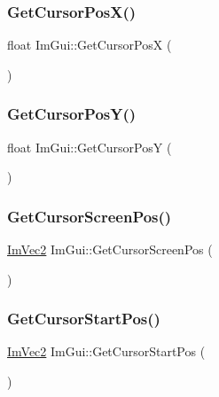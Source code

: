 \hypertarget{namespace_im_gui_a022e32c808ac899e25847f4d65633b77}{}\label{namespace_im_gui_a022e32c808ac899e25847f4d65633b77} 
\subsubsection{\texorpdfstring{Get\+Cursor\+Pos\+X()}{GetCursorPosX()}}
{\footnotesize\ttfamily float Im\+Gui\+::\+Get\+Cursor\+PosX (\begin{DoxyParamCaption}{ }\end{DoxyParamCaption})}

\hypertarget{namespace_im_gui_a86e409551f256b542166989c558d41c1}{}\label{namespace_im_gui_a86e409551f256b542166989c558d41c1} 
\subsubsection{\texorpdfstring{Get\+Cursor\+Pos\+Y()}{GetCursorPosY()}}
{\footnotesize\ttfamily float Im\+Gui\+::\+Get\+Cursor\+PosY (\begin{DoxyParamCaption}{ }\end{DoxyParamCaption})}

\hypertarget{namespace_im_gui_adb0db3c1ee36f5085f35890a4229ae75}{}\label{namespace_im_gui_adb0db3c1ee36f5085f35890a4229ae75} 
\subsubsection{\texorpdfstring{Get\+Cursor\+Screen\+Pos()}{GetCursorScreenPos()}}
{\footnotesize\ttfamily \hyperlink{struct_im_vec2}{Im\+Vec2} Im\+Gui\+::\+Get\+Cursor\+Screen\+Pos (\begin{DoxyParamCaption}{ }\end{DoxyParamCaption})}

\hypertarget{namespace_im_gui_a8ee9647de3b39fc7b77395082fc9e0cc}{}\label{namespace_im_gui_a8ee9647de3b39fc7b77395082fc9e0cc} 
\subsubsection{\texorpdfstring{Get\+Cursor\+Start\+Pos()}{GetCursorStartPos()}}
{\footnotesize\ttfamily \hyperlink{struct_im_vec2}{Im\+Vec2} Im\+Gui\+::\+Get\+Cursor\+Start\+Pos (\begin{DoxyParamCaption}{ }\end{DoxyParamCaption})}

